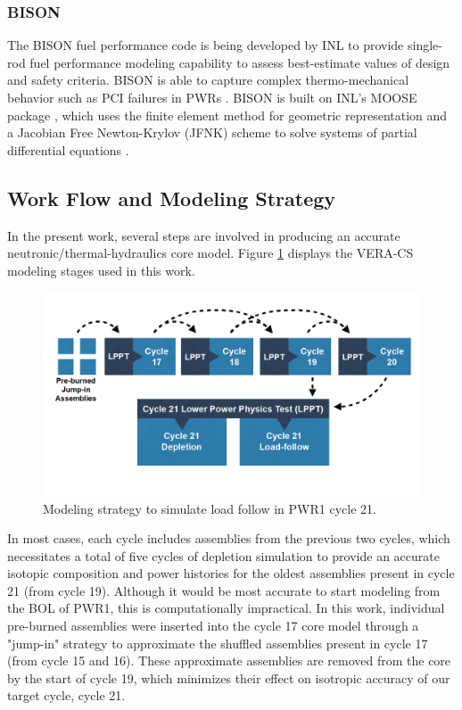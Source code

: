 \documentclass[edeposit,fullpage,12pt]{uiucthesis2009}
\begin{document}
\subsubsection{BISON}
The BISON fuel performance code is being developed by \gls{INL} to provide single-rod fuel performance modeling capability to assess best-estimate values of design and safety criteria. 
BISON is able to capture complex thermo-mechanical behavior such as PCI failures in PWRs \cite{montgomery_advanced_2014}. 
BISON is built on \gls{INL}'s \gls{MOOSE} package \cite{gaston_moose:_2009}, which uses the finite element method for geometric representation and a Jacobian Free Newton-Krylov (JFNK) scheme to solve systems of partial differential equations \cite{williamson_multidimensional_2012}. 


\subsection{Work Flow and Modeling Strategy}

In the present work, several steps are involved in producing an accurate neutronic/thermal-hydraulics core model. 
Figure \ref{fig:method} displays the VERA-CS modeling stages used in this work.


\begin{figure}
\begin{center}
\includegraphics[width=0.5\linewidth]{./Figures/method.png}
\end{center}
\caption{Modeling strategy to simulate load follow in PWR1 cycle 21.}
\label{fig:method}
\end{figure} 

In most cases, each cycle includes assemblies from the previous two cycles, which necessitates a total of five cycles of depletion simulation to provide an accurate isotopic composition and power histories for the oldest assemblies present in cycle 21 (from cycle 19). 
Although it would be most accurate to start modeling from the \gls{BOL} of PWR1, this is computationally impractical. 
In this work, individual pre-burned assemblies were inserted into the cycle 17 core model through a "jump-in" strategy to approximate the shuffled assemblies present in cycle 17 (from cycle 15 and 16). 
These approximate assemblies are removed from the core by the start of cycle 19, which minimizes their effect on isotropic accuracy of our target cycle, cycle 21. 
\end{document}
